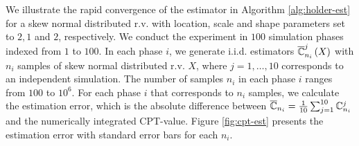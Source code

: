 We illustrate the rapid convergence of the estimator in Algorithm \ref{alg:holder-est} for a skew normal distributed  r.v. with location, scale and shape parameters set to $2,1$ and $2$, respectively. 
We conduct the experiment in $100$ simulation phases indexed from $1$ to $100$. In each phase $i$, we generate i.i.d. estimators $\overline{\mathbb{C}}^j_{n_i}\left(X\right)$ with $n_i$ samples of skew normal distributed r.v. $X$, where $j=1,\ldots,10$ corresponds to an independent simulation. The number of samples $n_i$ in each phase $i$ ranges from $100$ to $10^6$. For each phase $i$ that corresponds to $n_i$ samples, we calculate the estimation error, which is the absolute difference between $\overline {\mathbb{C}}_{n_i} = \frac1{10}\sum_{j=1}^{10}\mathbb{C}^j_{n_i}$ and the numerically integrated CPT-value. Figure \ref{fig:cpt-est} presents the estimation error with standard error bars for each $n_i$. 

\newcommand{\errorband}[5][]{ %
\pgfplotstableread[col sep=tab, skip first n=2]{#2}\datatable

    \addplot [draw=none, fill=gray!40, stack plots=y, area legend, #1] table [
        x={#3},
        y expr=4*\thisrow{#5}
    ] {\datatable} \closedcycle;

    \addplot [forget plot, stack plots=y,draw=none] table [x={#3}, y expr=-(\thisrow{#4}+2*\thisrow{#5})] {\datatable};
}

